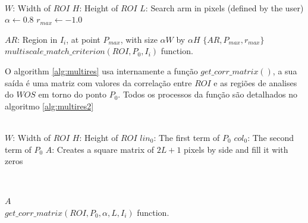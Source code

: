 \begin{algorithm}
 ~\\
 $W$: Width of $ROI$\;
 $H$: Height of $ROI$\;
 $L$: Search arm in pixels (defined by the user)\;
 $\alpha \leftarrow 0.8$\;
 $r_{max} \leftarrow -1.0$\;
 ~\\
    
$AR$: Region in $I_i$, at point $P_{max}$, with size $\alpha W$ by $\alpha H$\;      
\Return $\{AR,P_{max},r_{max}\}$\;
~\\
\caption{$multiscale\_match\_criterion(ROI,P_0,I_i)$ function.}
\label{alg:multires}
\end{algorithm}

O algorithm \ref{alg:multires} usa internamente a função $get\_corr\_matrix()$,
a sua saída é uma matriz com valores da correlação entre $ROI$ e as regiões de analises do $WOS$
em torno do ponto $P_0$. Todos os processos da função são detalhados no algoritmo
\ref{alg:multires2}


\begin{algorithm}
 ~\\
 $W$: Width of $ROI$\;
 $H$: Height of $ROI$\;
 $lin_0$: The first term of $P_0$\;
 $col_0$: The second term of $P_0$\;
 $A$: Creates a square matrix of $2L+1$ pixels by side and fill it with zeros\;

 ~\\
    
\Return $A$\;
~\\
\caption{$get\_corr\_matrix(ROI,P_0,\alpha,L,I_i)$ function.}
\label{alg:multires2}
\end{algorithm}

